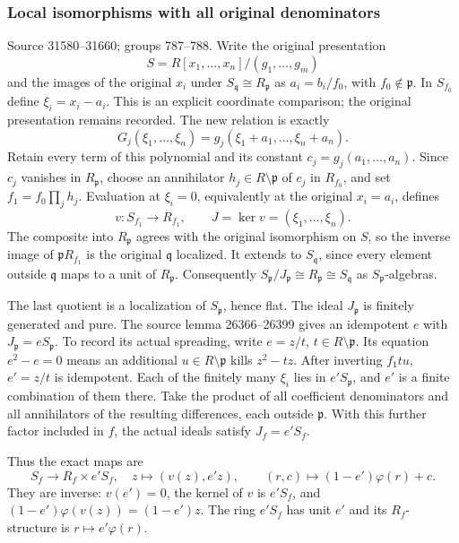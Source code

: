 \subsubsection{Local isomorphisms with all original denominators}\label{algebra-proof-035-local-isomorphisms-with-all-original-denominators}

Source 31580--31660; groups 787--788. Write the original presentation \[
S=R[x_1,\ldots,x_n]/(g_1,\ldots,g_m)
\] and the images of the original \(x_i\) under \(S_{\mathfrak q}\cong R_{\mathfrak p}\) as \(a_i=b_i/f_0\), with \(f_0\notin\mathfrak p\). In \(S_{f_0}\) define \(\xi_i=x_i-a_i\). This is an explicit coordinate comparison; the original presentation remains recorded. The new relation is exactly \[
G_j(\xi_1,\ldots,\xi_n)=g_j(\xi_1+a_1,\ldots,\xi_n+a_n).
\] Retain every term of this polynomial and its constant \(c_j=g_j(a_1,\ldots,a_n)\). Since \(c_j\) vanishes in \(R_{\mathfrak p}\), choose an annihilator \(h_j\in R\setminus\mathfrak p\) of \(c_j\) in \(R_{f_0}\), and set \(f_1=f_0\prod_jh_j\). Evaluation at \(\xi_i=0\), equivalently at the original \(x_i=a_i\), defines \[
v:S_{f_1}\to R_{f_1},\qquad J=\ker v=(\xi_1,\ldots,\xi_n).
\] The composite into \(R_{\mathfrak p}\) agrees with the original isomorphism on \(S\), so the inverse image of \(\mathfrak pR_{f_1}\) is the original \(\mathfrak q\) localized. It extends to \(S_{\mathfrak q}\), since every element outside \(\mathfrak q\) maps to a unit of \(R_{\mathfrak p}\). Consequently \(S_{\mathfrak p}/J_{\mathfrak p}\cong R_{\mathfrak p}\cong S_{\mathfrak q}\) as \(S_{\mathfrak p}\)-algebras.

The last quotient is a localization of \(S_{\mathfrak p}\), hence flat. The ideal \(J_{\mathfrak p}\) is finitely generated and pure. The source lemma 26366--26399 gives an idempotent \(e\) with \(J_{\mathfrak p}=eS_{\mathfrak p}\). To record its actual spreading, write \(e=z/t\), \(t\in R\setminus\mathfrak p\). Its equation \(e^2-e=0\) means an additional \(u\in R\setminus\mathfrak p\) kills \(z^2-tz\). After inverting \(f_1tu\), \(e'=z/t\) is idempotent. Each of the finitely many \(\xi_i\) lies in \(e'S_{\mathfrak p}\), and \(e'\) is a finite combination of them there. Take the product of all coefficient denominators and all annihilators of the resulting differences, each outside \(\mathfrak p\). With this further factor included in \(f\), the actual ideals satisfy \(J_f=e'S_f\).

Thus the exact maps are \[
S_f\longrightarrow R_f\times e'S_f,\quad z\longmapsto(v(z),e'z),
\qquad
(r,c)\longmapsto(1-e')\varphi(r)+c.
\] They are inverse: \(v(e')=0\), the kernel of \(v\) is \(e'S_f\), and \((1-e')\varphi(v(z))=(1-e')z\). The ring \(e'S_f\) has unit \(e'\) and its \(R_f\)-structure is \(r\mapsto e'\varphi(r)\).

